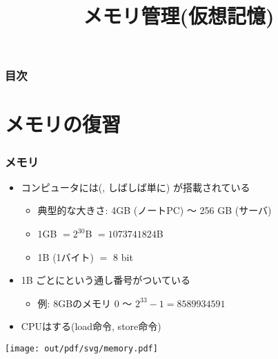 \documentclass[12pt,dvipdfmx]{beamer}
\title{メモリ管理(仮想記憶)}
\begin{document}
\maketitle

\begin{frame}
\frametitle{目次}
\tableofcontents
\end{frame}

\section{メモリの復習}

\begin{frame}
  \frametitle{メモリ}
  \begin{itemize}
  \item コンピュータには(,
    しばしば単に)
    が搭載されている
    \begin{itemize}
    \item 典型的な大きさ: 4GB (ノートPC) 〜 256 GB (サーバ)
    \item 1GB $= 2^{30}$B $= 1073741824$B
    \item 1B (1バイト) $=$ 8 bit
    \end{itemize}

  \item 1B ごとにという通し番号がついている
    \begin{itemize}
    \item 例: 8GBのメモリ 0 〜 $2^{33} - 1 = 8589934591$
    \end{itemize}

  \item CPUはする(load命令, store命令)
  \end{itemize}

  \begin{center}
  \texttt{[image: out/pdf/svg/memory.pdf]}
  \end{center}
  
\end{frame}
\end{document}

